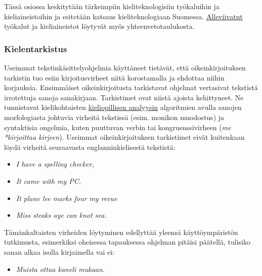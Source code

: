 \documentclass[]{../../metanetpaper}
\begin{document}
\begin{multicols}{2}
Tässä osiossa keskitytään tärkeimpiin kieliteknologisiin
työkaluihin ja kieliaineistoihin ja esitetään katsaus kieliteknologiaan
Suomessa.  \underline{Alleviivatut} työkalut ja kieliaineistot
löytyvät myös yhteenvetotaulukosta.



\subsubsection{Kielentarkistus}


Useimmat tekstinkäsittelyohjelmia käyttäneet tietävät, että oikeinkirjoituksen 
tarkistin tuo esiin kirjoitusvirheet niitä korostamalla ja ehdottaa niihin
korjauksia. Ensimmäiset oikeinkirjoitusta tarkistavat ohjelmat
vertasivat tekstistä irrotettuja sanoja sanakirjaan. Tarkistimet ovat niistä ajoista 
kehittyneet. Ne tunnistavat kielikohtaisten \underline{kieliopillisen analyysin}
algoritmien avulla sanojen morfologiasta johtuvia virheitä tekstissä 
(esim. monikon muodostus) ja syntaktisia ongelmia, kuten
puuttuvan verbin tai kongruenssivirheen (\textit{me *kirjoittaa
kirjeen}). Useimmat oikeinkirjoituksen tarkistimet eivät kuitenkaan
löydä virheitä seuraavasta englanninkielisestä tekstistä:
\begin{itemize} \item[] {\foreignlanguage{english}{\textit{I have a
spelling checker,}}}

\item[] {\foreignlanguage{english}{\textit{It came with my PC.}}}

\item[] {\foreignlanguage{english}{\textit{It plane lee marks four my revue}}}

\item[] {\foreignlanguage{english}
                {\textit{Miss steaks aye can knot sea.}}} \cite{Surprise}
\end{itemize}

Tämänkaltaisten virheiden löytyminen edellyttää yleensä
käyttöympäristön tutkimusta, esimerkiksi oheisessa tapauksessa
ohjelman pitäisi päätellä, tulisiko sanan alkaa 
isolla kirjaimella vai ei:
\begin{itemize}
\item[] \textit{Muista ottaa kaneli mukaan.}


\end{itemize}
\end{multicols}
\end{document}
